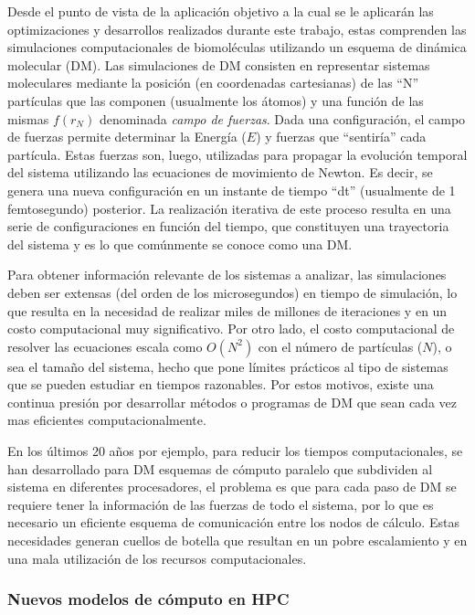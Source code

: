 \documentclass[a4paper,10pt]{article}
\begin{document}
Desde el punto de vista de la aplicaci\'on objetivo a la cual se le aplicar\'an las optimizaciones y desarrollos realizados durante este trabajo, estas comprenden las simulaciones computacionales de biomol\'eculas utilizando un esquema de din\'amica molecular (DM). 
Las simulaciones de DM consisten en representar sistemas moleculares mediante la posici\'on (en coordenadas cartesianas) de las ``N'' part\'iculas que las componen (usualmente los \'atomos) y una funci\'on de las mismas $f(r_N)$ denominada \emph{campo de fuerzas}. 
Dada una configuraci\'on, el campo de fuerzas permite determinar la Energ\'ia ($E$) y fuerzas que ``sentir\'ia'' cada part\'icula. 
Estas fuerzas son, luego, utilizadas para propagar la evoluci\'on temporal del sistema utilizando las ecuaciones de movimiento de Newton. 
Es decir, se genera una nueva configuraci\'on en un instante de tiempo ``dt'' (usualmente de 1 femtosegundo) posterior. 
La realizaci\'on iterativa de este proceso resulta en una serie de configuraciones en funci\'on del tiempo, que constituyen una trayectoria del sistema y es lo que com\'unmente se conoce como una DM.

Para obtener informaci\'on relevante de los sistemas a analizar, las simulaciones deben ser extensas (del orden de los microsegundos) en tiempo de simulaci\'on, lo que resulta en la necesidad de realizar miles de millones de iteraciones y en un costo computacional muy significativo. 
Por otro lado, el costo computacional de resolver las ecuaciones escala como $O(N^2)$ con el n\'umero de part\'iculas ($N$), o sea el tama\~no del sistema, hecho que pone l\'imites pr\'acticos al tipo de sistemas que se pueden estudiar en tiempos razonables. 
Por estos motivos, existe una continua presi\'on por desarrollar m\'etodos o programas de DM que sean cada vez mas eficientes computacionalmente. 

En los \'ultimos 20 a\~nos por ejemplo, para reducir los tiempos computacionales, se han desarrollado para DM esquemas de c\'omputo paralelo que subdividen al sistema en diferentes procesadores, el problema es que para cada paso de DM se requiere tener la informaci\'on de las fuerzas de todo el sistema, por lo que es necesario un eficiente esquema de comunicaci\'on entre los nodos de c\'alculo. Estas necesidades generan cuellos de botella que resultan en un pobre escalamiento y en una mala utilizaci\'on de los recursos computacionales.

\subsubsection*{Nuevos modelos de c\'omputo en HPC}
\end{document}
